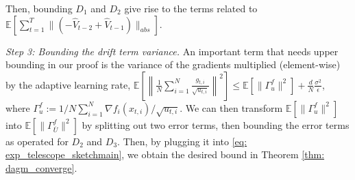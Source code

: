 \documentclass[11pt]{article}
\begin{document}
 Then, bounding $D_1$ and $D_2$ give rise to the terms related to $    \mathbb E \left [    \sum_{t=1}^T  \| ( - \hat V_{t-2} + \hat V_{t-1}) \|_{abs}   \right]$.


\textsl{Step 3: Bounding the drift term variance.}\hspace{0.01in} An important term that needs upper bounding in our proof is the variance of the gradients multiplied (element-wise) by the adaptive learning rate, $ \mathbb E\left[ \left\| \frac{1}{N} \sum_{i=1}^N \frac{g_{t,i}}{\sqrt{u_{t,i}}} \right\|^2 \right]  \leq   \mathbb E [\| \Gamma_{u}^f\|^2 ] + \frac{d}{N}   \frac{ \sigma^2 }{\epsilon}$,
 where $ \Gamma_{u}^f := 1/N \sum_{i=1}^N \nabla f_i(x_{t,i})/\sqrt{u_{t,i}} $. We can then transform $\mathbb E [\| \Gamma_{u}^f\|^2 ]$ into $\mathbb E [\|\Gamma_{\overline{U}}^f \|^2]$ by splitting out two error terms, then bounding the error terms as operated for $D_2$ and $D_3$. Then, by plugging it into \eqref{eq: exp_telescope_sketchmain}, we obtain the desired bound in Theorem \ref{thm: dagm_converge}.


\vspace{0.05in}
\end{document}
